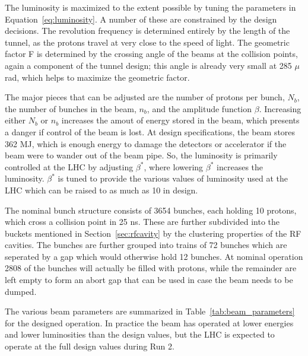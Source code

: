 The luminosity is maximized to the extent possible by tuning the parameters in Equation~\ref{eq:luminosity}.
A number of these are constrained by the design decisions.
The revolution frequency is determined entirely by the length of the tunnel, as the protons travel at very close to the speed of light.
The geometric factor F is determined by the crossing angle of the beams at the collision points, again a component of the tunnel design; this angle is already very small at 285 $\mu$rad, which helps to maximize the geometric factor.

The major pieces that can be adjusted are the number of protons per bunch, $N_b$, the number of bunches in the beam, $n_b$, and the amplitude function $\beta$.
Increasing either $N_b$ or $n_b$ increases the amout of energy stored in the beam, which presents a danger if control of the beam is lost.
At design specifications, the beam stores 362 MJ, which is enough energy to damage the detectors or accelerator if the beam were to wander out of the beam pipe.
So, the luminosity is primarily controlled at the \ac{LHC} by adjusting $\beta^*$, where lowering $\beta^*$ increases the luminosity.
$\beta^*$ is tuned to provide the various values of luminosity used at the \ac{LHC} which can be raised to as much as 10 in design.

The nominal bunch structure consists of 3654 bunches, each holding 10 protons, which cross a collision point in 25 ns. 
These are further subdivided into the buckets mentioned in Section~\ref{sec:rfcavity} by the clustering properties of the \ac{RF} cavities.
The bunches are further grouped into trains of 72 bunches which are seperated by a gap which would otherwise hold 12 bunches.
At nominal operation 2808 of the bunches will actually be filled with protons, while the remainder are left empty to form an abort gap that can be used in case the beam needs to be dumped.

The various beam parameters are summarized in Table~\ref{tab:beam_parameters} for the designed operation.
In practice the beam has operated at lower energies and lower luminosities than the design values, but the \ac{LHC} is expected to operate at the full design values during Run 2.

